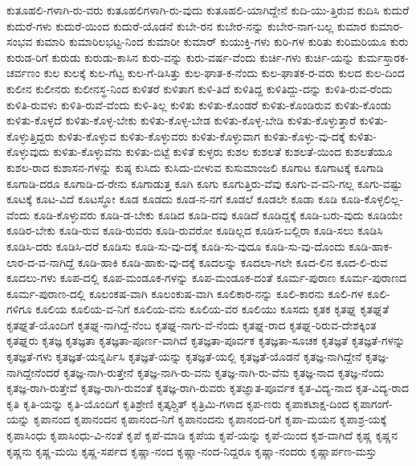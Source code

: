 {ಕುತೂಹಲಿ-ಗಳಾಗಿ-ರು-ವರು
ಕುತೂಹಲಿಗಳಾಗಿ-ರು-ವುದು
ಕುತೂಹಲಿ-ಯಾಗಿದ್ದೇನೆ
ಕುದಿ-ಯು-ತ್ತಿರುವ
ಕುದಿಸಿ
ಕುದುರೆ
ಕುದುರೆ-ಗಳು
ಕುದುರೆ-ಯಿಂದ
ಕುದುರೆ-ಯೊಡನೆ
ಕುಬೇ-ರನ
ಕುಬೇರ-ನನ್ನು
ಕುಬೇರ-ನಾಗ-ಬಲ್ಲ
ಕುಮಾರ
ಕುಮಾರ-ಸಂಭವ
ಕುಮಾರಿ
ಕುಮಾರಿಲಭಟ್ಟ-ನಿಂದ
ಕುಮಾರೀ
ಕುಮಾರ್
ಕುಯುಕ್ತಿ-ಗಳು
ಕುರಿ-ಗಳ
ಕುರಿತು
ಕುರಿಮರಿಯೂ
ಕುರು
ಕುರುಡ-ರಿಗೆ
ಕುರುಡು
ಕುರುಡು-ಕಾಸಿನ
ಕುರು-ವನ್ನು
ಕುರು-ವರ್ಷ-ವೆಂದು
ಕುರ್ಚಿ-ಗಳು
ಕುರ್ಚಿ-ಯನ್ನು
ಕುರ್ಮಸ್ತಾರಕ-ಚರ್ವಣಂ
ಕುಲ
ಕುಲಕ್ಕೆ
ಕುಲ-ಗೆಟ್ಟ
ಕುಲ-ಗೆ-ಡಿಸಿತ್ತು
ಕುಲ-ಘಾತ-ಕ-ನೆಂದು
ಕುಲ-ಘಾತಕ-ರ-ವರು
ಕುಲದ
ಕುಲ-ದಿಂದ
ಕುಲೀನ
ಕುಲೀನರು
ಕುಲೀನಸ್ಥ-ನಿಂದ
ಕುಳಿತರೆ
ಕುಳಿತಾಗ
ಕುಳಿ-ತಿದೆ
ಕುಳಿತಿದ್ದ
ಕುಳಿತಿದ್ದು-ದನ್ನು
ಕುಳಿತಿ-ರುವ-ರೆಂದು
ಕುಳಿತಿ-ರುವಳು
ಕುಳಿತಿ-ರುವೆ-ವೆಂದು
ಕುಳಿ-ತಿಲ್ಲ
ಕುಳಿತು
ಕುಳಿತು-ಕೊಂಡರೆ
ಕುಳಿತು-ಕೊಂಡಿರುವ
ಕುಳಿತು-ಕೊಂಡು
ಕುಳಿತು-ಕೊಳ್ಳದೆ
ಕುಳಿತು-ಕೊಳ್ಳ-ಬೇಕು
ಕುಳಿತು-ಕೊಳ್ಳ-ಬೇಡ
ಕುಳಿತು-ಕೊಳ್ಳ-ಬೇಡಿ
ಕುಳಿತು-ಕೊಳ್ಳುತ್ತಾರೆ
ಕುಳಿತು-ಕೊಳ್ಳುತ್ತಿದ್ದರು
ಕುಳಿತು-ಕೊಳ್ಳುವ
ಕುಳಿತು-ಕೊಳ್ಳುವರು
ಕುಳಿತು-ಕೊಳ್ಳುವಾಗ
ಕುಳಿತು-ಕೊಳ್ಳು-ವು-ದಕ್ಕೆ
ಕುಳಿತು-ಕೊಳ್ಳುವುದು
ಕುಳಿತು-ಕೊಳ್ಳುವೆನು
ಕುಳಿತು-ಬಿಟ್ಟೆ
ಕುಳಿತೆ
ಕುಳ್ಳರು
ಕುಶಲ
ಕುಶಲತೆ
ಕುಶಲತೆ-ಯಿಂದ
ಕುಶಲತೆಯೂ
ಕುಶಲ-ರಾದ
ಕುಶಾಸನ-ಗಳನ್ನು
ಕುಷ್ಠ
ಕುಸಿದು
ಕುಸಿದು-ಬೀಳುವ
ಕುಸುಮಾಂಜಲಿ
ಕೂಗಾಟ
ಕೂಗಾಟಕ್ಕೆ
ಕೂಗಾಡಿ
ಕೂಗಾಡಿ-ದರೂ
ಕೂಗಾಡಿ-ದ-ರೇನು
ಕೂಗಾಡುತ್ತ
ಕೂಗಿ
ಕೂಗು
ಕೂಗುತ್ತಿರು-ವೆವು
ಕೂಗು-ವ-ವನಿ-ಗಲ್ಲ
ಕೂಗು-ವಷ್ಟು
ಕೂಟಕ್ಕೆ
ಕೂಟ-ವಿದೆ
ಕೂಟಸ್ಥೋ
ಕೂಡ
ಕೂಡದು
ಕೂಡ-ನ-ನಗೆ
ಕೂಡಲೆ
ಕೂಡಲೇ
ಕೂಡಾ
ಕೂಡಿ
ಕೂಡಿ-ಕೊಳ್ಳಲಿಲ್ಲ-ವೆಂದು
ಕೂಡಿ-ಕೊಳ್ಳುವರು
ಕೂಡಿ-ಡ-ಬೇಕು
ಕೂಡಿದ
ಕೂಡಿ-ದವು
ಕೂಡಿದೆ
ಕೂಡಿದ್ದಕ್ಕೆ
ಕೂಡಿ-ಬರು-ವುದು
ಕೂಡಿಯೇ
ಕೂಡಿರ-ಬೇಕು
ಕೂಡಿ-ರುವ
ಕೂಡಿ-ರುವರು
ಕೂಡಿ-ರುವರೋ
ಕೂಡಿಲ್ಲದ
ಕೂಡಿಸ-ಬಲ್ಲಿರಾ
ಕೂಡಿ-ಸಲು
ಕೂಡಿಸಿ
ಕೂಡಿಸಿ-ದರು
ಕೂಡಿಸಿ-ದರೆ
ಕೂಡಿಸು
ಕೂಡಿ-ಸು-ವು-ದಕ್ಕೆ
ಕೂಡಿ-ಸು-ವುದೂ
ಕೂಡಿ-ಸು-ವು-ದೊಂದು
ಕೂಡಿ-ಹಾಕ-ಲಾರ-ದ-ವ-ನಾಗಿದ್ದೆ
ಕೂಡಿ-ಹಾಕಿ
ಕೂಡಿ-ಹಾಕು-ವು-ದಕ್ಕೆ
ಕೂದಲನ್ನು
ಕೂದಲಾ-ಗಲೇ
ಕೂದ-ಲಿನ
ಕೂದ-ಲಿ-ರುವ
ಕೂದಲು-ಗಳು
ಕೂಪ-ದಲ್ಲಿ
ಕೂಪ-ಮಂಡೂಕ-ಗಳನ್ನು
ಕೂಪ-ಮಂಡೂಕ-ದಂತೆ
ಕೂರ್ಮ-ಪುರಾಣ
ಕೂರ್ಮ-ಪುರಾಣದ
ಕೂರ್ಮ-ಪುರಾಣ-ದಲ್ಲಿ
ಕೂಲಂಕಷ-ವಾಗಿ
ಕೂಲಂಕುಷ-ವಾಗಿ
ಕೂಲಿಕಾರ-ನನ್ನು
ಕೂಲಿ-ಕಾರನು
ಕೂಲಿ-ಗಳ
ಕೂಲಿ-ಗಳಿಗೂ
ಕೂಲಿಯ
ಕೂಲಿಯ-ವ-ನಿಗೆ
ಕೂಲಿಯ-ವನು
ಕೂಲಿಯ-ವರ
ಕೂಲಿಯು
ಕೂಸದು
ಕೃತಕ
ಕೃತಘ್ನ
ಕೃತಘ್ನತೆ
ಕೃತಘ್ನತೆ-ಯೊಂದಿಗೆ
ಕೃತಘ್ನ-ನಾಗಿದ್ದೆ-ನೆಂಬ
ಕೃತಘ್ನ-ನಾಗು-ವೆ-ನೆಂದು
ಕೃತಘ್ನ-ರಾದ
ಕೃತಘ್ನ-ರಿರುವ-ದೇಶಕ್ಕಿಂತ
ಕೃತಘ್ನರು
ಕೃತಜ್ಞ
ಕೃತಜ್ಞತಾ
ಕೃತಜ್ಞತಾ-ಪೂರ್ಣ-ವಾಗಿದೆ
ಕೃತಜ್ಞತಾ-ಪೂರ್ವಕ
ಕೃತಜ್ಞತಾ-ಸೂಚಕ
ಕೃತಜ್ಞತೆ
ಕೃತಜ್ಞತೆ-ಗಳನ್ನು
ಕೃತಜ್ಞತೆ-ಗಳು
ಕೃತಜ್ಞತೆ-ಯನ್ನರ್ಪಿಸಿ
ಕೃತಜ್ಞತೆ-ಯನ್ನು
ಕೃತಜ್ಞತೆ-ಯಲ್ಲಿ
ಕೃತಜ್ಞತೆ-ಯೊಡನೆ
ಕೃತಜ್ಞ-ನಾಗಿದ್ದೇನೆ
ಕೃತಜ್ಞ-ನಾಗಿದ್ದೇನೆಂದರೆ
ಕೃತಜ್ಞ-ನಾಗಿ-ರುತ್ತೇನೆ
ಕೃತಜ್ಞ-ನಾಗಿ-ರು-ವನು
ಕೃತಜ್ಞ-ನಾಗಿ-ರು-ವೆನು
ಕೃತಜ್ಞ-ನಾದ
ಕೃತಜ್ಞ-ನೆಂದು
ಕೃತಜ್ಞ-ರಾಗಿ-ರುತ್ತೇವೆ
ಕೃತಜ್ಞ-ರಾಗಿ-ರುವಂತೆ
ಕೃತಜ್ಞ-ರಾಗಿ-ರುವರು
ಕೃತಜ್ಞಾತ-ಪೂರ್ವಕ
ಕೃತ-ವಿದ್ಯ-ನಾದ
ಕೃತ-ವಿದ್ಯ-ರಾದ
ಕೃತಿ
ಕೃತಿ-ಯನ್ನು
ಕೃತಿ-ಯೊಂದಿಗೆ
ಕೃತಿಶ್ರೇಣಿ
ಕೃತ್ಕಶ್ಚಿತ್
ಕೃತ್ರಿಮಿ-ಗಳಾದ
ಕೃಪ-ಣರು
ಕೃಪಾಕಟಾಕ್ಷ-ದಿಂದ
ಕೃಪಾಗಂಗೆ-ಯನ್ನು
ಕೃಪಾನಂದ
ಕೃಪಾನಂದನ
ಕೃಪಾನಂದ-ನಿಗೆ
ಕೃಪಾನಂದನು
ಕೃಪಾನಂದ-ರಿಗೆ
ಕೃಪಾ-ಮಯನ
ಕೃಪಾಶ್ರ-ಯಕ್ಕೆ
ಕೃಪಾಸಿಂಧು
ಕೃಪಾಸಿಂಧು-ವಿ-ನಂತೆ
ಕೃಪೆ
ಕೃಪೆ-ಮಾಡಿ
ಕೃಪೆಯ
ಕೃಪೆ-ಯನ್ನು
ಕೃಪೆ-ಯಿಂದ
ಕೃಶ-ವಾಗಿದೆ
ಕೃಷ್ಣ
ಕೃಷ್ಣನ
ಕೃಷ್ಣನು
ಕೃಷ್ಣ-ಮಯಿ
ಕೃಷ್ಣ-ಸರ್ಪದ
ಕೃಷ್ಣಾ-ನಂದ
ಕೃಷ್ಣಾ-ನಂದ-ನಿದ್ದರೂ
ಕೃಷ್ಣಾ-ನಂದರು
ಕೃಷ್ಣಾರ್ಪಣ-ಮಸ್ತು
}
